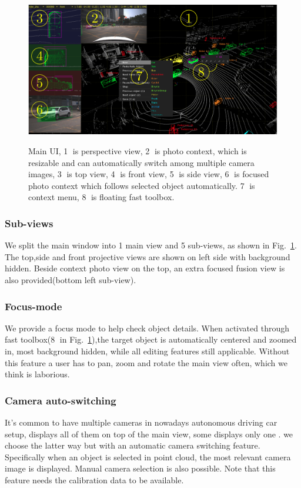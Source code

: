 \documentclass[letterpaper, 10 pt, conference]{ieeeconf}  %
\begin{document}
\begin{figure}[!t]
	\centering	
	\includegraphics[width=\linewidth]{./figures/main-ui}\\
	\caption{Main UI, \textcircled{1} is perspective view, \textcircled{2} is photo context, which is resizable and can automatically switch among multiple camera images, \textcircled{3} is top view, \textcircled{4} is front view, \textcircled{5} is side view, \textcircled{6} is focused photo context which follows selected object automatically. \textcircled{7} is context menu, \textcircled{8} is floating fast toolbox.}
	\label{fig:main-ui}
\end{figure}

\subsubsection{Sub-views}
\label{section:sub-views}
We split the main window into 1 main view and 5 sub-views, as shown in Fig.~\ref{fig:main-ui}. The top,side and front projective views are shown on left side with background hidden. Beside context photo view on the top, an extra focused fusion view is also provided(bottom left sub-view).




\subsubsection{Focus-mode}
We provide a focus mode to help check object details. When activated through fast toolbox(\textcircled{8} in Fig.~\ref{fig:main-ui}),the target object is automatically centered and zoomed in, most background hidden, while all editing features still applicable. Without this feature a user has to pan,  zoom and rotate the main view often, which we think is laborious.

\subsubsection{Camera auto-switching}
It's common to have multiple cameras in nowadays autonomous driving car setup, \cite{Zimmer20193DBA} displays all of them on top of the main view, some displays only one \cite{scale}. we choose the latter way but with an automatic camera switching feature. Specifically when an object is selected in point cloud, the most relevant camera image is displayed. Manual camera selection is also possible. Note that this feature needs the calibration data to be available.
\end{document}
